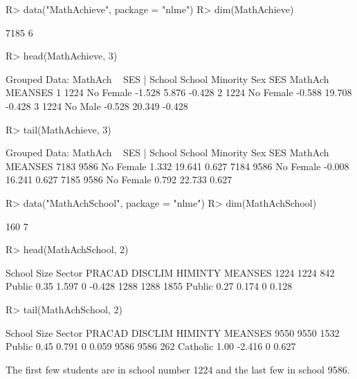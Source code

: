 \documentclass[
]{jss}
\begin{document}
\begin{CodeChunk}
\begin{CodeInput}
R> data("MathAchieve", package = "nlme")
R> dim(MathAchieve)
\end{CodeInput}
\begin{CodeOutput}
[1] 7185    6
\end{CodeOutput}
\begin{CodeInput}
R> head(MathAchieve, 3)
\end{CodeInput}
\begin{CodeOutput}
Grouped Data: MathAch ~ SES | School
  School Minority    Sex    SES MathAch MEANSES
1   1224       No Female -1.528   5.876  -0.428
2   1224       No Female -0.588  19.708  -0.428
3   1224       No   Male -0.528  20.349  -0.428
\end{CodeOutput}
\begin{CodeInput}
R> tail(MathAchieve, 3)
\end{CodeInput}
\begin{CodeOutput}
Grouped Data: MathAch ~ SES | School
     School Minority    Sex    SES MathAch MEANSES
7183   9586       No Female  1.332  19.641   0.627
7184   9586       No Female -0.008  16.241   0.627
7185   9586       No Female  0.792  22.733   0.627
\end{CodeOutput}
\begin{CodeInput}
R> data("MathAchSchool", package = "nlme")
R> dim(MathAchSchool)
\end{CodeInput}
\begin{CodeOutput}
[1] 160   7
\end{CodeOutput}
\begin{CodeInput}
R> head(MathAchSchool, 2)
\end{CodeInput}
\begin{CodeOutput}
     School Size Sector PRACAD DISCLIM HIMINTY MEANSES
1224   1224  842 Public   0.35   1.597       0  -0.428
1288   1288 1855 Public   0.27   0.174       0   0.128
\end{CodeOutput}
\begin{CodeInput}
R> tail(MathAchSchool, 2)
\end{CodeInput}
\begin{CodeOutput}
     School Size   Sector PRACAD DISCLIM HIMINTY MEANSES
9550   9550 1532   Public   0.45   0.791       0   0.059
9586   9586  262 Catholic   1.00  -2.416       0   0.627
\end{CodeOutput}
\end{CodeChunk}

The first few students are in school number 1224 and the last few in
school 9586.
\end{document}
